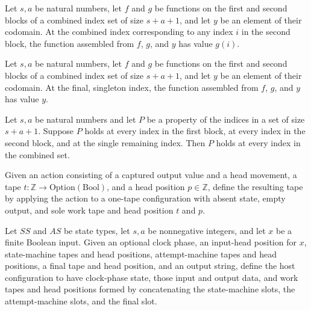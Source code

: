 \begin{theorem}
\label{Turing.ClockHost.slots_aI}
\leanok
{}
Let $s,a$ be natural numbers, let $f$ and $g$ be functions on the first and second
blocks of a combined index set of size $s+a+1$, and let $y$ be an element of their
codomain. At the combined index corresponding to any index $i$ in the second block, the
function assembled from $f$, $g$, and $y$ has value $g(i)$.
\end{theorem}

\begin{theorem}
\label{Turing.ClockHost.slots_yI}
\leanok
{}
Let $s,a$ be natural numbers, let $f$ and $g$ be functions on the first and second
blocks of a combined index set of size $s+a+1$, and let $y$ be an element of their
codomain. At the final, singleton index, the function assembled from $f$, $g$, and $y$
has value $y$.
\end{theorem}

\begin{theorem}
\label{Turing.ClockHost.slots_cases}
\leanok
{}
Let $s,a$ be natural numbers and let $P$ be a property of the indices in a set of size
$s+a+1$. Suppose $P$ holds at every index in the first block, at every index in the
second block, and at the single remaining index. Then $P$ holds at every index in the
combined set.
\end{theorem}

\begin{definition}
\label{Turing.ClockHost.tapeAfter}
\leanok
Given an action consisting of a captured output value and a head movement, a tape
$t:\mathbb{Z}\to\mathrm{Option}(\mathrm{Bool})$, and a head position $p\in\mathbb{Z}$,
define the resulting tape by applying the action to a one-tape configuration with absent
state, empty output, and sole work tape and head position $t$ and $p$.
\end{definition}

\begin{definition}
\label{Turing.ClockHost.hostCfg}
\leanok
{}
Let $SS$ and $AS$ be state types, let $s,a$ be nonnegative integers, and let $x$ be a
finite Boolean input. Given an optional clock phase, an input-head position for $x$,
state-machine tapes and head positions, attempt-machine tapes and head positions, a
final tape and head position, and an output string, define the host configuration to
have clock-phase state, those input and output data, and work tapes and head positions
formed by concatenating the state-machine slots, the attempt-machine slots, and the
final slot.
\end{definition}

